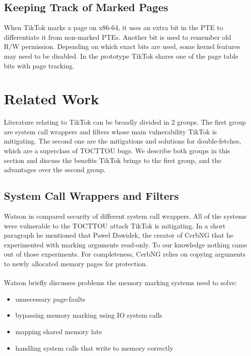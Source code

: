 \documentclass[conference]{IEEEtran}
\begin{document}
\subsection{Keeping Track of Marked Pages}

When TikTok marks a page on x86-64, it uses an extra bit in the PTE to differentiate it from non-marked PTEs. Another bit is used to remember old R/W permission.
Depending on which exact bits are used, some kernel features may need to be disabled. In the prototype TikTok shares one of the page table bits with page tracking.

\section{Related Work}

Literature relating to TikTok can be broadly divided in 2 groups. The first group are system call wrappers and filters whose main vulnerability TikTok is mitigating.
The second one are the mitigations and solutions for double-fetches, which are a superclass of TOCTTOU bugs. We describe both groups in this section and discuss the
benefits TikTok brings to the first group, and the advantages over the second group.

\subsection{System Call Wrappers and Filters}

Watson in \cite{watson} compared security of different system call wrappers. All of the systems were vulnerable to the TOCTTOU attack TikTok is mitigating. 
In a short paragraph he mentioned that Pawel Dawidek, the creator of CerbNG \cite{cerbng} that he experimented with marking 
arguments read-only. To our knowledge nothing came out of those experiments. For completeness, CerbNG relies on copying arguments to newly allocated memory 
pages for protection.
\\
\\
Watson briefly discusses problems the memory marking systems need to solve: 
\begin{itemize}
    \item unnecessary page-faults
    \item bypassing memory marking using IO system calls
    \item mapping shared memory late
    \item handling system calls that write to memory correctly
\end{itemize}
\end{document}

